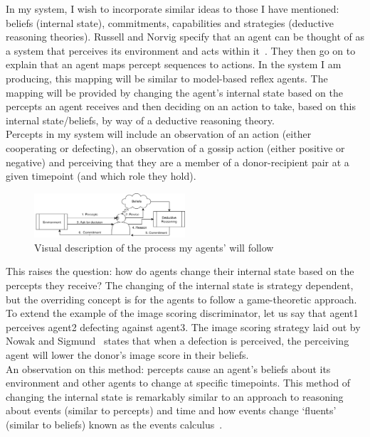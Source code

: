 \documentclass[twoside,twocolumn]{article}
\begin{document}
In my system, I wish to incorporate similar ideas to those I have mentioned: beliefs (internal state), commitments, capabilities and strategies (deductive reasoning theories). Russell and Norvig specify that an agent can be thought of as a system that perceives its environment and acts within it~\cite{russell2016artificial}. They then go on to explain that an agent maps percept sequences to actions. In the system I am producing, this mapping will be similar to model-based reflex agents. The mapping will be provided by changing the agent's internal state based on the percepts an agent receives and then deciding on an action to take, based on this internal state/beliefs, by way of a deductive reasoning theory.\\
Percepts in my system will include an observation of an action (either cooperating or defecting), an observation of a gossip action (either positive or negative) and perceiving that they are a member of a donor-recipient pair at a given timepoint (and which role they hold).
\begin{figure}
	\begin{center}
	\includegraphics[width=0.5\textwidth]{PerceiveReviseDecide.png}
	\caption{Visual description of the process my agents' will follow}
	\label{fig:percept_to_action}
	\end{center}
\end{figure}
\noindent This raises the question: how do agents change their internal state based on the percepts they receive? The changing of the internal state is strategy dependent, but the overriding concept is for the agents to follow a game-theoretic approach.\\
To extend the example of the image scoring discriminator, let us say that agent1 perceives agent2 defecting against agent3. The image scoring strategy laid out by Nowak and Sigmund~\cite{evol_indirect_image} states that when a defection is perceived, the perceiving agent will lower the donor's image score in their beliefs.\\
An observation on this method: percepts cause an agent's beliefs about its environment and other agents to change at specific timepoints. This method of changing the internal state is remarkably similar to an approach to reasoning about events (similar to percepts) and time and how events change `fluents' (similar to beliefs) known as the events calculus~\cite{kowalski1989logic}.\\
\end{document}
